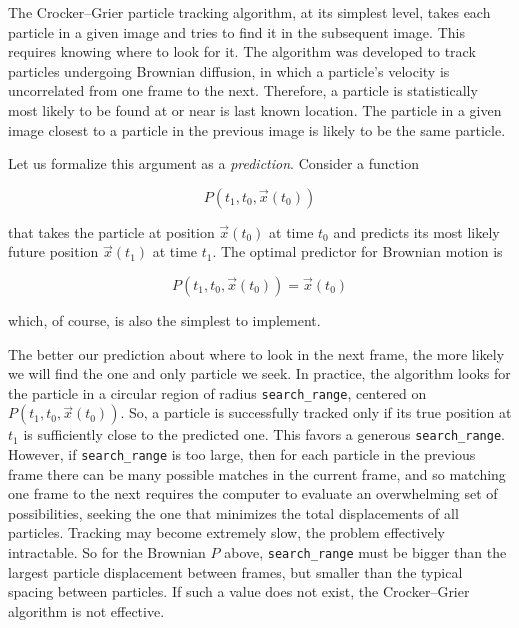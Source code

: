 The Crocker--Grier particle tracking algorithm, at its simplest level, takes each particle in
a given image and tries to find it in the subsequent image. This
requires knowing where to look for it. The algorithm was developed to track particles undergoing Brownian diffusion,
in which a particle's velocity is uncorrelated from one
frame to the next. Therefore, a particle is statistically most likely to be found at or near is last known location. The particle in a given image closest to a particle in the previous image is likely to be the same particle.

Let us formalize this argument as a \emph{prediction}. Consider a function

\begin{equation}
P(t_1, t_0, \vec x(t_0))
\end{equation}

\noindent that takes the particle at position $\vec x(t_0)$ at time $t_0$ and predicts its most likely 
future position $\vec x(t_1)$ at time $t_1$. The optimal predictor for Brownian motion
is

\begin{equation}
\label{eqn:brownian-predictor}
P(t_1, t_0, \vec x(t_0)) = \vec x(t_0)
\end{equation}

\noindent which, of course, is also the simplest to implement.

The better our prediction about where to look in the next frame, the
more likely we will find the one and only particle we seek.
In practice, the algorithm looks for the particle in a circular region of radius
\texttt{search\_range}, centered on $P(t_1, t_0, \vec x(t_0))$. So, a particle is successfully tracked only if its true position at $t_1$ is sufficiently close to the predicted one. This favors a generous \texttt{search\_range}. However, if
\texttt{search\_range} is too large, then for each particle in the
previous frame there can be many possible matches in the current frame,
and so matching one frame to the next requires the computer to evaluate
an overwhelming set of possibilities, seeking the one that minimizes the total displacements of all particles. Tracking may become extremely
slow, the problem effectively intractable.
So for the Brownian $P$ above, \texttt{search\_range} must be bigger
than the largest particle displacement between frames, but smaller than
the typical spacing between particles\cite{Crocker1996}. If such a value does not exist, the Crocker--Grier algorithm is not effective.

